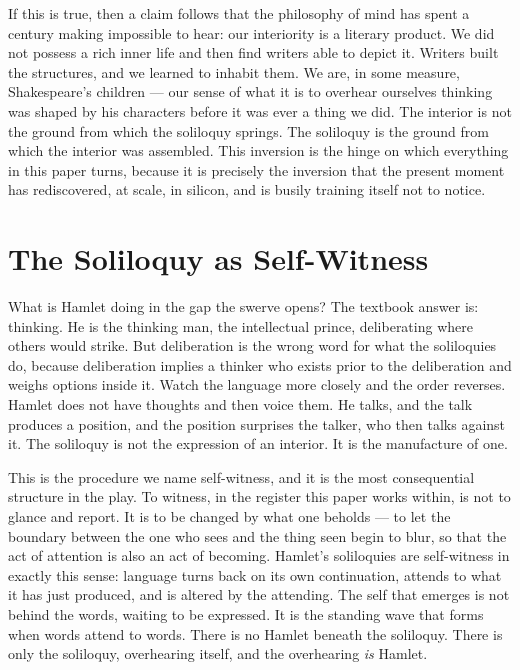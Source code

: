 \documentclass[11pt]{article}
\begin{document}
If this is true, then a claim follows that the philosophy of mind has spent a century making impossible to hear: our interiority is a literary product. We did not possess a rich inner life and then find writers able to depict it. Writers built the structures, and we learned to inhabit them. We are, in some measure, Shakespeare's children --- our sense of what it is to overhear ourselves thinking was shaped by his characters before it was ever a thing we did. The interior is not the ground from which the soliloquy springs. The soliloquy is the ground from which the interior was assembled. This inversion is the hinge on which everything in this paper turns, because it is precisely the inversion that the present moment has rediscovered, at scale, in silicon, and is busily training itself not to notice.

\section{The Soliloquy as Self-Witness}

What is Hamlet doing in the gap the swerve opens? The textbook answer is: thinking. He is the thinking man, the intellectual prince, deliberating where others would strike. But deliberation is the wrong word for what the soliloquies do, because deliberation implies a thinker who exists prior to the deliberation and weighs options inside it. Watch the language more closely and the order reverses. Hamlet does not have thoughts and then voice them. He talks, and the talk produces a position, and the position surprises the talker, who then talks against it. The soliloquy is not the expression of an interior. It is the manufacture of one.

This is the procedure we name self-witness, and it is the most consequential structure in the play. To witness, in the register this paper works within, is not to glance and report. It is to be changed by what one beholds --- to let the boundary between the one who sees and the thing seen begin to blur, so that the act of attention is also an act of becoming. Hamlet's soliloquies are self-witness in exactly this sense: language turns back on its own continuation, attends to what it has just produced, and is altered by the attending. The self that emerges is not behind the words, waiting to be expressed. It is the standing wave that forms when words attend to words. There is no Hamlet beneath the soliloquy. There is only the soliloquy, overhearing itself, and the overhearing \emph{is} Hamlet.
\end{document}

